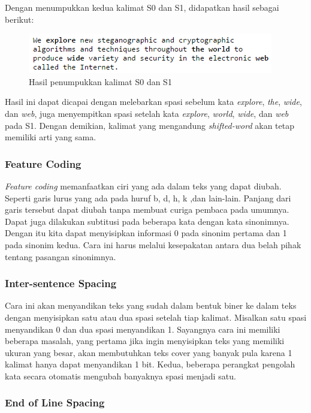 Dengan menumpukkan kedua kalimat S0 dan S1, didapatkan hasil sebagai berikut:

\begin{figure}[H]
	\centering
	\includegraphics[scale=0.8]{Gambar/overlap-result}
	\caption{Hasil penumpukkan kalimat S0 dan S1}
\end{figure}


Hasil ini dapat dicapai dengan melebarkan spasi sebelum kata \textit{explore}, \textit{the}, \textit{wide}, dan \textit{web}, juga menyempitkan spasi setelah kata \textit{explore}, \textit{world}, \textit{wide}, dan \textit{web} pada S1. Dengan demikian, kalimat yang mengandung \textit{shifted-word} akan tetap memiliki arti yang sama.

\subsubsection{Feature Coding}

\textit{Feature coding} memanfaatkan ciri yang ada dalam teks yang dapat diubah. Seperti garis lurus yang ada pada huruf b, d, h, k ,dan lain-lain. Panjang dari garis tersebut dapat diubah tanpa membuat curiga pembaca pada umumnya. Dapat juga dilakukan subtitusi pada beberapa kata dengan kata sinonimnya. Dengan itu kita dapat menyisipkan informasi 0 pada sinonim pertama dan 1 pada sinonim kedua. Cara ini harus melalui kesepakatan antara dua belah pihak tentang pasangan sinonimnya.

\subsubsection{Inter-sentence Spacing}

Cara ini akan menyandikan teks yang sudah dalam bentuk biner ke dalam teks dengan menyisipkan satu atau dua spasi setelah tiap kalimat. Misalkan satu spasi menyandikan 0 dan dua spasi menyandikan 1. Sayangnya cara ini memiliki beberapa masalah, yang pertama jika ingin menyisipkan teks yang memiliki ukuran yang besar, akan membutuhkan teks cover yang banyak pula karena 1 kalimat hanya dapat menyandikan 1 bit. Kedua, beberapa perangkat pengolah kata secara otomatis mengubah banyaknya spasi menjadi satu.

\subsubsection{End of Line Spacing}

